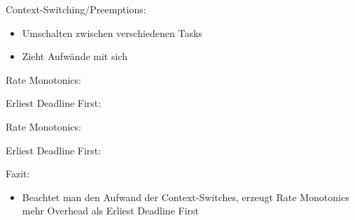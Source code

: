 \begin{frame}{\subsecname}
	Context-Switching/Preemptions:
	\begin{itemize}
		\item Umschalten zwischen verschiedenen Tasks
		\item Zieht Aufwände mit sich
	\end{itemize}
\end{frame}

\begin{frame}{\subsecname}
	Rate Monotonics:
	
	Erliest Deadline First:
	
\end{frame}

\begin{frame}{\subsecname}
	Rate Monotonics:
	
	Erliest Deadline First:
	
\end{frame}

\begin{frame}{\subsecname}
	Fazit:
	\begin{itemize}
		\item Beachtet man den Aufwand der Context-Switches, erzeugt Rate Monotonics mehr Overhead als Erliest Deadline First
	\end{itemize}
\end{frame}

